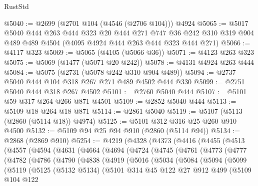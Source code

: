 \begin{lexlean}{RustStd}
\begin{coremodule}
@5040 := @2699 (@2701 @104 (@4546 (@2706 @104))) @4924
@5065 := @5017
    @5040
    @444
    @263
    @444
    @323
    @20
    @444
    @271
    @747
    @36
    @242
    @310
    @319
    @904
    @489
    @489
    @4504
    (@4095 @4924 @444 @263 @444 @323 @444 @271)
@5066 := @4117 @323
@5069 := @5065 (@4105 (@5066 @36))
@5071 := @4123 @263 @323
@5075 := @5069 (@1477 (@5071 @20 @242))
@5078 := @4131 @4924 @263 @444
@5084 := @5075 (@2731 (@5078 @242 @310 @904 @489))
@5094 := @2737 @5040 @444 @104 @318 @267 @271 @489 @4502 @444 @330
@5099 := @2751 @5040 @444 @318 @267 @4502
@5101 := @2760 @5040 @444
@5107 := @5101 @59 @317 @264 @266 @871 @4501
@5109 := @2852 @5040 @444
@5113 := @5109 @18 @264 @18 @871
@5114 := @2861 @5040
@5119 := @5107 (@5113 (@2860 (@5114 @18)) @4974)
@5125 := @5101 @312 @316 @25 @260 @910 @4500
@5132 := @5109 @94 @25 @94 @910 (@2860 (@5114 @94))
@5134 := @2868 (@2869 @910)
@5254 := @4219
    (@4328
      (@4373
        (@4416
          (@4455
            (@4513
              (@4557
                (@4594
                  (@4631
                    (@4664
                      (@4694
                        (@4724
                          (@4745
                            (@4761
                              (@4773
                                (@4777
                                  (@4782
                                    (@4786
                                      (@4790
                                        (@4838
                                          (@4919
                                            (@5016
                                              (@5034
                                                (@5084
                                                  (@5094
                                                    (@5099
                                                      (@5119
                                                        (@5125
                                                          (@5132 @5134)
                                                          (@5101
                                                            @314
                                                            @45
                                                            @122
                                                            @27
                                                            @912
                                                            @499
                                                            (@5109
                                                              @104
                                                              @122

\end{coremodule}
\end{lexlean}
